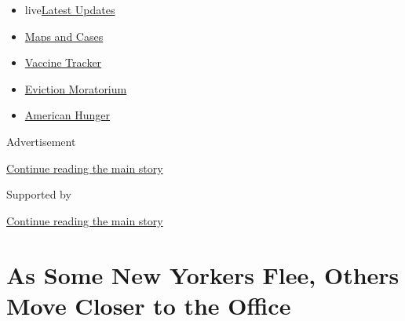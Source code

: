 \begin{itemize}
\tightlist
\item
  live\href{https://www.nytimes3xbfgragh.onion/2020/09/08/world/covid-19-coronavirus.html?name=styln-coronavirus-national\&region=TOP_BANNER\&block=storyline_menu_recirc\&action=click\&pgtype=Article\&impression_id=36ab9871-f1c8-11ea-b5fb-29abc66233f3\&variant=undefined}{Latest
  Updates}
\item
  \href{https://www.nytimes3xbfgragh.onion/interactive/2020/us/coronavirus-us-cases.html?name=styln-coronavirus-national\&region=TOP_BANNER\&block=storyline_menu_recirc\&action=click\&pgtype=Article\&impression_id=36abbf80-f1c8-11ea-b5fb-29abc66233f3\&variant=undefined}{Maps
  and Cases}
\item
  \href{https://www.nytimes3xbfgragh.onion/interactive/2020/science/coronavirus-vaccine-tracker.html?name=styln-coronavirus-national\&region=TOP_BANNER\&block=storyline_menu_recirc\&action=click\&pgtype=Article\&impression_id=36abbf81-f1c8-11ea-b5fb-29abc66233f3\&variant=undefined}{Vaccine
  Tracker}
\item
  \href{https://www.nytimes3xbfgragh.onion/2020/09/02/your-money/eviction-moratorium-covid.html?name=styln-coronavirus-national\&region=TOP_BANNER\&block=storyline_menu_recirc\&action=click\&pgtype=Article\&impression_id=36abbf82-f1c8-11ea-b5fb-29abc66233f3\&variant=undefined}{Eviction
  Moratorium}
\item
  \href{https://www.nytimes3xbfgragh.onion/interactive/2020/09/02/magazine/food-insecurity-hunger-us.html?name=styln-coronavirus-national\&region=TOP_BANNER\&block=storyline_menu_recirc\&action=click\&pgtype=Article\&impression_id=36abbf83-f1c8-11ea-b5fb-29abc66233f3\&variant=undefined}{American
  Hunger}
\end{itemize}

Advertisement

\protect\hyperlink{after-top}{Continue reading the main story}

Supported by

\protect\hyperlink{after-sponsor}{Continue reading the main story}

\hypertarget{as-some-new-yorkers-flee-others-move-closer-to-the-office}{%
\section{As Some New Yorkers Flee, Others Move Closer to the
Office}\label{as-some-new-yorkers-flee-others-move-closer-to-the-office}}

